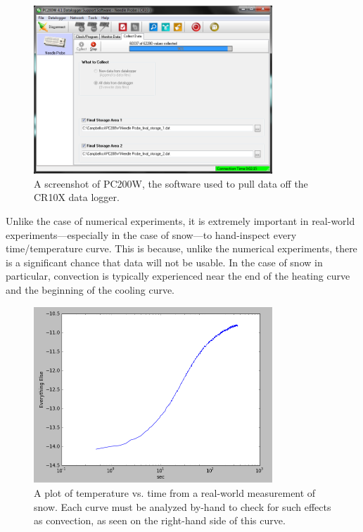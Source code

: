\begin{figure}[h]
\centering
\includegraphics[width=0.8\textwidth]{fig/pc200w.png}
\caption{A screenshot of PC200W, the software used to pull data off the CR10X data logger.}
\label{fig:pc200w}
\end{figure}

Unlike the case of numerical experiments, it is extremely important in
real-world experiments---especially in the case of snow---to hand-inspect every
time/temperature curve. This is because, unlike the numerical experiments, there
is a significant chance that data will not be usable. In the case of snow in
particular, convection is typically experienced near the end of the heating
curve and the beginning of the cooling curve.

\begin{figure}[h]
\centering
\includegraphics[width=0.8\textwidth]{fig/measurement_graph.png}
\caption{A plot of temperature vs. time from a real-world measurement of snow.
Each curve must be analyzed by-hand to check for such effects as convection, as seen on the right-hand side of this curve.}
\label{fig:meas_graph}
\end{figure}



